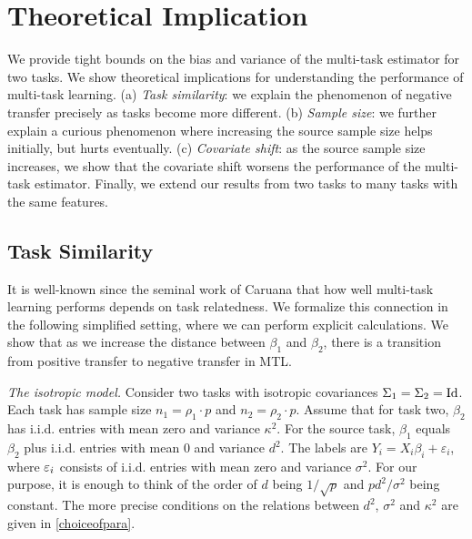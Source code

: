 \section{Theoretical Implication}\label{sec_insight}

We provide tight bounds on the bias and variance of the multi-task estimator for two tasks.
We show theoretical implications for understanding the performance of multi-task learning.
(a) \textit{Task similarity}: we explain the phenomenon of negative transfer precisely as tasks become more different.
(b) \textit{Sample size}: we further explain a curious phenomenon where increasing the source sample size helps initially, but hurts eventually.
(c) \textit{Covariate shift}: as the source sample size increases, we show that the covariate shift worsens the performance of the multi-task estimator.
Finally, we extend our results from two tasks to many tasks with the same features.




\subsection{Task Similarity}\label{sec_similarity}

It is well-known since the seminal work of Caruana \cite{C97} that how well multi-task learning performs depends on task relatedness.
We formalize this connection in the following simplified setting, where we can perform explicit calculations.
We show that as we increase the distance between $\beta_1$ and $\beta_2$, there is a transition from positive transfer to negative transfer in MTL.

\textit{The isotropic model.}
	Consider two tasks with isotropic covariances $\Sigma_1 = \Sigma_2 = \operatorname{Id}$.
	Each task has sample size $n_1 = \rho_1 \cdot p$ and $n_2 = \rho_2 \cdot p$.
	Assume that for  task two, $\beta_2$ has i.i.d. entries with mean zero and variance $\kappa^2$.
	For the source task, $\beta_1 $ equals $\beta_2$ plus i.i.d. entries with mean $0$ and variance $d^2$.
	The labels are $Y_i = X_i\beta_i + \varepsilon_i$, where ${\varepsilon}_i$ consists of i.i.d. entries with mean zero and variance $\sigma^2$.
	For our purpose, it is enough to think of the order of $d$ being $1/\sqrt{p}$ and $pd^2/\sigma^2$ being constant. The more precise conditions on the relations between $d^2$, $\sigma^2$ and $\kappa^2$ are given in \eqref{choiceofpara}.

